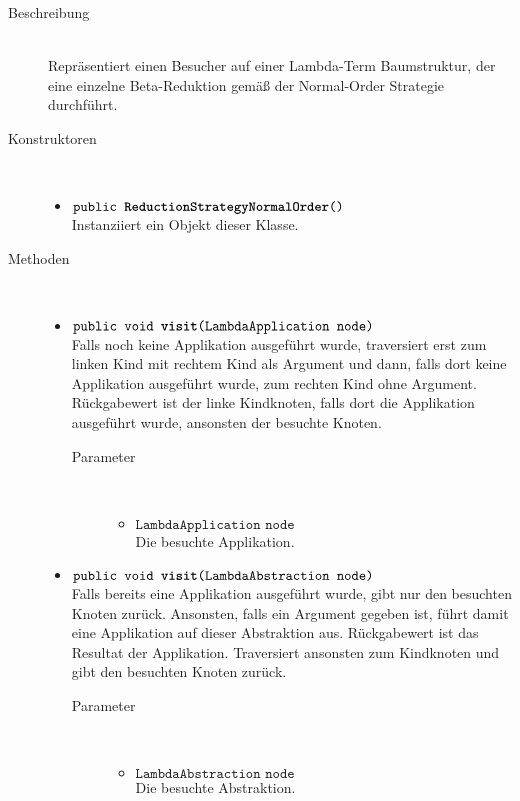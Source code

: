 \begin{description}
\item[Beschreibung] \hfill \\ Repräsentiert einen Besucher auf einer Lambda-Term Baumstruktur, der eine einzelne Beta-Reduktion gemäß der Normal-Order Strategie durchführt.

\item[Konstruktoren] \hfill \\
	\vspace{-.8cm}
	\begin{itemize}
		\item $\texttt{public \textbf{ReductionStrategyNormalOrder}()}$ \\ Instanziiert ein Objekt dieser Klasse.
	\end{itemize}

\item[Methoden] \hfill \\
	\vspace{-.8cm}
	\begin{itemize}
		\item $\texttt{public void \textbf{visit}(LambdaApplication node)}$ \\ Falls noch keine Applikation ausgeführt wurde, traversiert erst zum linken Kind mit rechtem Kind als Argument und dann, falls dort keine Applikation ausgeführt wurde, zum rechten Kind ohne Argument. Rückgabewert ist der linke Kindknoten, falls dort die Applikation ausgeführt wurde, ansonsten der besuchte Knoten.
		\begin{description}
			\item[Parameter] \hfill \\
			\vspace{-.8cm}
			\begin{itemize}
				\item $\texttt{LambdaApplication node}$ \\ Die besuchte Applikation.
			\end{itemize}
		\end{description}
		
		\item $\texttt{public void \textbf{visit}(LambdaAbstraction node)}$ \\ Falls bereits eine Applikation ausgeführt wurde, gibt nur den besuchten Knoten zurück. Ansonsten, falls ein Argument gegeben ist, führt damit eine Applikation auf dieser Abstraktion aus. Rückgabewert ist das Resultat der Applikation. Traversiert ansonsten zum Kindknoten und gibt den besuchten Knoten zurück.
		\begin{description}
			\item[Parameter] \hfill \\
			\vspace{-.8cm}
			\begin{itemize}
				\item $\texttt{LambdaAbstraction node}$ \\ Die besuchte Abstraktion.
			\end{itemize}
		\end{description}
	\end{itemize}
\end{description}


